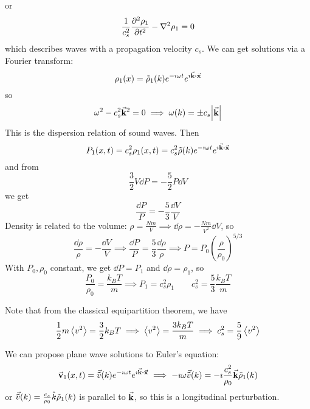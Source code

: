 \documentclass[a4paper,twoside,master.tex]{subfiles}
\begin{document}
or
\begin{equation}
    \frac{1}{c_s^2} \pdv[2]{\rho_1}{t} - \laplacian{\rho_1} = 0
\end{equation}
which describes waves with a propagation velocity $ c_s $. We can get solutions via a Fourier transform:
\begin{equation}
    \rho_1(x) = \tilde{\rho}_1(k) e^{- \imath \omega t} e^{\imath \va{k} \vdot \va{x}}
\end{equation}
so
\begin{equation}
    \omega^2 - c_s^2 \va{k}^2 = 0 \implies \omega(k) = \pm c_s \abs{\va{k}}
\end{equation}
This is the dispersion relation of sound waves. Then
\begin{equation}
    P_1(x, t) = c_s^2 \rho_1(x,t) = c_s^2 \tilde{\rho}(k) e^{- \imath \omega t} e^{\imath \va{k} \vdot \va{x}}
\end{equation}
and from
\begin{equation}
    \frac{3}{2} V \dd{P} = - \frac{5}{2} P \dd{V}
\end{equation}
we get
\begin{equation}
    \frac{\dd{P}}{P} = - \frac{5}{3} \frac{\dd{V}}{V}
\end{equation}
Density is related to the volume: $ \rho = \frac{Nm}{V} \implies \dd{\rho} = - \frac{Nm}{V^2} \dd{V} $, so
\begin{equation}
    \frac{\dd{\rho}}{\rho} = - \frac{\dd{V}}{V} \implies \frac{\dd{P}}{P} = \frac{5}{3} \frac{\dd{\rho}}{\rho} \implies P = P_0 \left( \frac{\rho}{\rho_0} \right)^{5/3}
\end{equation}
With $ P_0, \rho_0 $ constant, we get $ \dd{P} = P_1 $ and $ \dd{\rho} = \rho_1 $, so
\begin{equation}
    \frac{P_0}{\rho_0} = \frac{k_B T}{m} \implies P_1 = c_s^2 \rho_1 \qquad c_s^2 = \frac{5}{3} \frac{k_B T}{m}
\end{equation}

Note that from the classical equipartition theorem, we have
\begin{equation}
    \frac{1}{2} m \ev{v^2} = \frac{3}{2} k_B T \implies \ev{v^2} = \frac{3 k_B T}{m} \implies c_s^2 = \frac{5}{9} \ev{v^2}
\end{equation}

We can propose plane wave solutions to Euler's equation:
\begin{equation}
    \va{v}_1(x,t) = \va{\tilde{v}}(k) e^{- \imath \omega t} e^{\imath \va{k} \vdot \va{x}} \implies - \imath \omega \va{\tilde{v}}(k) = - \imath \frac{c_s^2}{\rho_0} \va{k} \tilde{\rho}_1(k)
\end{equation}
or $ \va{\tilde{v}}(k) = \frac{c_s}{\rho_0} \hat{k} \tilde{\rho}_1(k) $ is parallel to $ \va{k} $, so this is a longitudinal perturbation.
\end{document}
